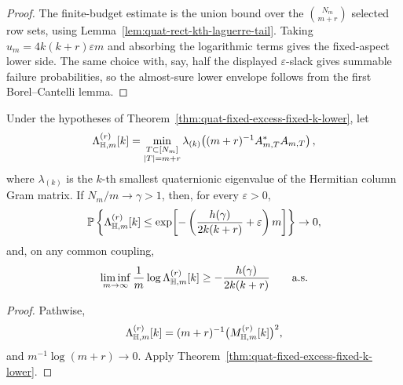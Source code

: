 \begin{proof}
The finite-budget estimate is the union bound over the
\(\binom{N_m}{m+r}\) selected row sets, using
Lemma~\ref{lem:quat-rect-kth-laguerre-tail}.  Taking
\(u_m=4k(k+r)\varepsilon m\) and absorbing the logarithmic terms gives the
fixed-aspect lower side.  The same choice with, say, half the displayed
\(\varepsilon\)-slack gives summable failure probabilities, so the almost-sure
lower envelope follows from the first Borel--Cantelli lemma.
\end{proof}

\begin{corollary}\label{cor:quat-rect-kth-gram-lower}
Under the hypotheses of Theorem~\ref{thm:quat-fixed-excess-fixed-k-lower}, let
\[
  \Lambda_{\mathbb{H},m}^{(r)}[k]
  =
  \min_{\substack{T\subset[N_m]\\ |T|=m+r}}
  \lambda_{(k)}\!\left((m+r)^{-1}A_{m,T}^*A_{m,T}\right),
\]
where \(\lambda_{(k)}\) is the \(k\)-th smallest quaternionic eigenvalue of the
Hermitian column Gram matrix.  If \(N_m/m\to\gamma>1\), then, for every
\(\varepsilon>0\),
\[
  \mathbb{P}\left\{\Lambda_{\mathbb{H},m}^{(r)}[k]\le
  \exp\!\left[-\left(\frac{h(\gamma)}{2k(k+r)}+\varepsilon\right)m\right]\right\}
  \to0,
\]
and, on any common coupling,
\[
  \liminf_{m\to\infty}\frac1m\log \Lambda_{\mathbb{H},m}^{(r)}[k]
  \ge -\frac{h(\gamma)}{2k(k+r)}
  \qquad\hbox{a.s.}
\]
\end{corollary}

\begin{proof}
Pathwise,
\[
  \Lambda_{\mathbb{H},m}^{(r)}[k]
  =(m+r)^{-1}\bigl(M_{\mathbb{H},m}^{(r)}[k]\bigr)^2,
\]
and \(m^{-1}\log(m+r)\to0\).  Apply
Theorem~\ref{thm:quat-fixed-excess-fixed-k-lower}.
\end{proof}

